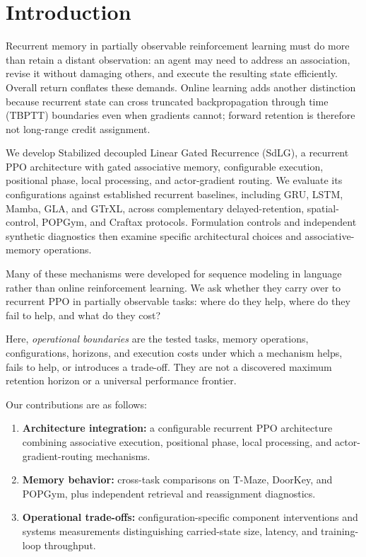 \section{Introduction}
\label{sec:intro}

Recurrent memory in partially observable reinforcement learning must do more than retain a distant observation: an agent may need to address an association, revise it without damaging others, and execute the resulting state efficiently. Overall return conflates these demands. Online learning adds another distinction because recurrent state can cross truncated backpropagation through time (TBPTT) boundaries even when gradients cannot; forward retention is therefore not long-range credit assignment.

We develop Stabilized decoupled Linear Gated Recurrence (SdLG), a recurrent PPO architecture with gated associative memory, configurable execution, positional phase, local processing, and actor-gradient routing. We evaluate its configurations against established recurrent baselines, including GRU, LSTM, Mamba, GLA, and GTrXL, across complementary delayed-retention, spatial-control, POPGym, and Craftax protocols. Formulation controls and independent synthetic diagnostics then examine specific architectural choices and associative-memory operations.

Many of these mechanisms were developed for sequence modeling in language rather than online reinforcement learning. We ask whether they carry over to recurrent PPO in partially observable tasks: where do they help, where do they fail to help, and what do they cost?

Here, \emph{operational boundaries} are the tested tasks, memory operations, configurations, horizons, and execution costs under which a mechanism helps, fails to help, or introduces a trade-off. They are not a discovered maximum retention horizon or a universal performance frontier.

Our contributions are as follows:
\begin{enumerate}
    \item \textbf{Architecture integration:} a configurable recurrent PPO architecture combining associative execution, positional phase, local processing, and actor-gradient-routing mechanisms.
    \item \textbf{Memory behavior:} cross-task comparisons on T-Maze, DoorKey, and POPGym, plus independent retrieval and reassignment diagnostics.
    \item \textbf{Operational trade-offs:} configuration-specific component interventions and systems measurements distinguishing carried-state size, latency, and training-loop throughput.
\end{enumerate}
